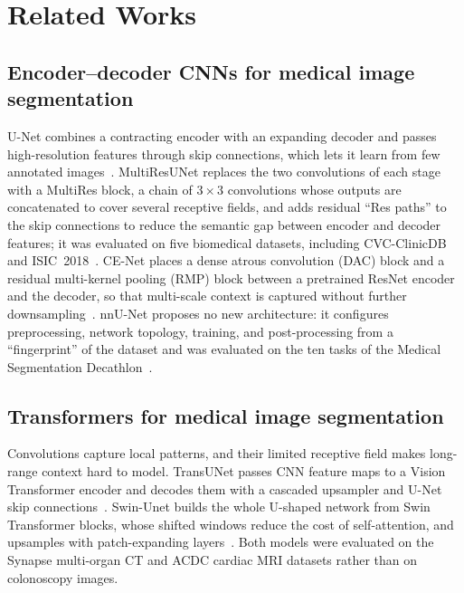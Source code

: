 \documentclass[10pt,twoside]{article}
\begin{document}
\section{Related Works}\label{sec:related}
\subsection{Encoder--decoder CNNs for medical image segmentation}
U-Net combines a contracting encoder with an expanding decoder and passes
high-resolution features through skip connections, which lets it learn from few
annotated images~\cite{ronneberger2015unet}. MultiResUNet replaces the two
convolutions of each stage with a MultiRes block, a chain of $3\times3$ convolutions
whose outputs are concatenated to cover several receptive fields, and adds residual
``Res paths'' to the skip connections to reduce the semantic gap between encoder and
decoder features; it was evaluated on five biomedical datasets, including
CVC-ClinicDB and ISIC~2018~\cite{ibtehaz2020multiresunet}. CE-Net places a dense
atrous convolution (DAC) block and a residual multi-kernel pooling (RMP) block
between a pretrained ResNet encoder and the decoder, so that multi-scale context is
captured without further downsampling~\cite{gu2019cenet}. nnU-Net proposes no new
architecture: it configures preprocessing, network topology, training, and
post-processing from a ``fingerprint'' of the dataset and was evaluated on the ten
tasks of the Medical Segmentation Decathlon~\cite{isensee2018nnunet}.

\subsection{Transformers for medical image segmentation}
Convolutions capture local patterns, and their limited receptive field makes
long-range context hard to model. TransUNet passes CNN feature maps to a Vision
Transformer encoder and decodes them with a cascaded upsampler and U-Net skip
connections~\cite{chen2021transunet}. Swin-Unet builds the whole U-shaped network
from Swin Transformer blocks, whose shifted windows reduce the cost of
self-attention, and upsamples with patch-expanding layers~\cite{cao2022swinunet}.
Both models were evaluated on the Synapse multi-organ CT and ACDC cardiac MRI
datasets rather than on colonoscopy images.
\end{document}
